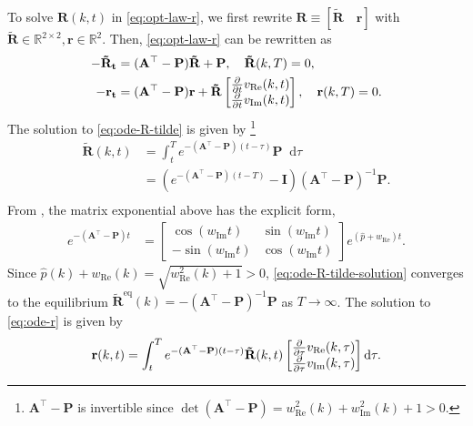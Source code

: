 \documentclass[journal,twoside,web]{ieeecolor}
\newcommand{\RR}{\mathbb{R}}
\newcommand*\diff{\mathop{}\!\mathrm{d}}
\begin{document}
	To solve $\mathbf{R}(k,t)$ in \eqref{eq:opt-law-r}, we first rewrite $\mathbf{R\equiv[\tilde{R}\quad r]}$ with $\mathbf{\tilde{R}}\in\RR^{2\times2},\mathbf{r}\in\RR^2$. Then, \eqref{eq:opt-law-r} can be rewritten as
	\begin{align}
		-\mathbf{\tilde{R}_t} &=\mathbf{ (A^\top-P) \tilde{R} + P},\quad \mathbf{\tilde{R}}(k,T)=0,\label{eq:ode-R-tilde}\\ 
		-\mathbf{r_t }& =\mathbf{ (A^\top-P) r + \tilde{R}}\begin{bmatrix}\pdv{}{t}v_{\text{Re}}(k,t)  \\ \pdv{}{t}v_{\text{Im}}(k,t)\end{bmatrix},\quad \mathbf{r}(k,T)=0  .\label{eq:ode-r}
	\end{align} 
	The solution to \eqref{eq:ode-R-tilde} is given by \footnote{$\mathbf{A^\top-P}$ is invertible since $\det(\mathbf{A^\top-P})=w_{\text{Re}}^2(k) + w_{\text{Im}}^2(k) + 1>0$.}
	\begin{equation}\label{eq:ode-R-tilde-solution}
		\begin{aligned}
			\mathbf{\tilde{R}}(k,t) &= \int_{t}^{T}e^{-(\mathbf{A^\top-P})(t-\tau)}\mathbf{P}\diff\tau\\
			&=(e^{-(\mathbf{A^\top - P})(t-T)} - \mathbf{I})(\mathbf{A^\top-P})^{-1}\mathbf{P}. \\
		\end{aligned}
	\end{equation}
	From \cite[Example 1]{bernstein1993some}, the matrix exponential above has the explicit form,
	\begin{equation*}
		\begin{aligned}
			e^{-(\mathbf{A^\top - P}) t} &= \begin{bmatrix}
				\cos(w_{\text{Im}}t) & \sin(w_{\text{Im}}t) \\ -\sin(w_{\text{Im}}t) & \cos(w_{\text{Im}}t)
			\end{bmatrix}e^{(\hat{p} + w_{\text{Re}})t}.
		\end{aligned}
	\end{equation*}
	Since $\hat{p}(k) + w_{\text{Re}}(k) = \sqrt{w_{\text{Re}}^2(k) + 1}>0$, \eqref{eq:ode-R-tilde-solution} converges to the equilibrium $\mathbf{\tilde{R}}^{\text{eq}}(k) = \mathbf{-(A^\top-P)}^{-1}\mathbf{P}$ as $T\to\infty$.
The solution to \eqref{eq:ode-r} is given by
\begin{equation*}
	\begin{aligned}
		\mathbf{r}(k,t) &= \int_{t}^{T}e^{-(\mathbf{A^\top-P})(t-\tau)}\mathbf{\tilde{R}}(k,t)\begin{bmatrix}\pdv{}{\tau}v_{\text{Re}}(k,\tau)  \\ \pdv{}{\tau}v_{\text{Im}}(k,\tau)\end{bmatrix}\diff\tau. \\
	\end{aligned}
\end{equation*}
\end{document}
